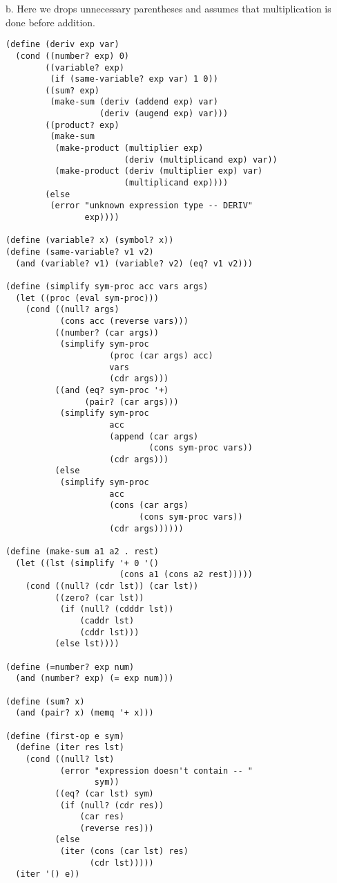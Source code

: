 \documentclass[a4paper,12pt]{article}
\begin{document}
\medskip
b. Here we drops unnecessary parentheses and assumes that
multiplication is done before addition.
\begin{lstlisting}
(define (deriv exp var)
  (cond ((number? exp) 0)
        ((variable? exp)
         (if (same-variable? exp var) 1 0))
        ((sum? exp)
         (make-sum (deriv (addend exp) var)
                   (deriv (augend exp) var)))
        ((product? exp)
         (make-sum
          (make-product (multiplier exp)
                        (deriv (multiplicand exp) var))
          (make-product (deriv (multiplier exp) var)
                        (multiplicand exp))))
        (else
         (error "unknown expression type -- DERIV"
                exp))))

(define (variable? x) (symbol? x))
(define (same-variable? v1 v2)
  (and (variable? v1) (variable? v2) (eq? v1 v2)))

(define (simplify sym-proc acc vars args)
  (let ((proc (eval sym-proc)))
    (cond ((null? args)
           (cons acc (reverse vars)))
          ((number? (car args))
           (simplify sym-proc
                     (proc (car args) acc)
                     vars
                     (cdr args)))
          ((and (eq? sym-proc '+)
                (pair? (car args)))
           (simplify sym-proc
                     acc
                     (append (car args)
                             (cons sym-proc vars))
                     (cdr args)))
          (else
           (simplify sym-proc
                     acc
                     (cons (car args)
                           (cons sym-proc vars))
                     (cdr args))))))

(define (make-sum a1 a2 . rest)
  (let ((lst (simplify '+ 0 '()
                       (cons a1 (cons a2 rest)))))
    (cond ((null? (cdr lst)) (car lst))
          ((zero? (car lst))
           (if (null? (cdddr lst))
               (caddr lst)
               (cddr lst)))
          (else lst))))

(define (=number? exp num)
  (and (number? exp) (= exp num)))

(define (sum? x)
  (and (pair? x) (memq '+ x)))

(define (first-op e sym)
  (define (iter res lst)
    (cond ((null? lst)
           (error "expression doesn't contain -- "
                  sym))
          ((eq? (car lst) sym)
           (if (null? (cdr res))
               (car res)
               (reverse res)))
          (else
           (iter (cons (car lst) res)
                 (cdr lst)))))
  (iter '() e))


\end{lstlisting}
\end{document}
